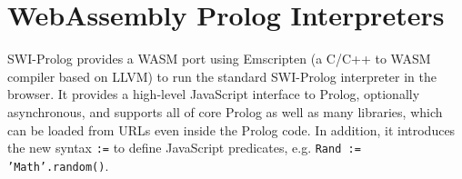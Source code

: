 \documentclass{article}
\begin{document}
\section{WebAssembly Prolog Interpreters}

SWI-Prolog provides a WASM port \cite{swiprologwasm} using Emscripten (a C/C++ to WASM compiler based on LLVM) to run the standard SWI-Prolog interpreter in the browser. It provides a high-level JavaScript interface to Prolog, optionally asynchronous, and supports all of core Prolog as well as many libraries, which can be loaded from URLs even inside the Prolog code. In addition, it introduces the new syntax \texttt{:=} to define JavaScript predicates, e.g. \texttt{Rand := 'Math'.random()}.



\end{document}
